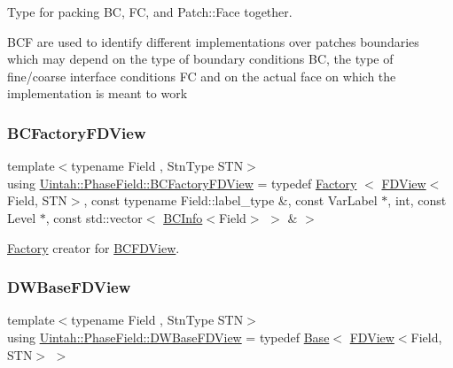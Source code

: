Type for packing BC, FC, and Patch\+::\+Face together. 

B\+CF are used to identify different implementations over patches boundaries which may depend on the type of boundary conditions BC, the type of fine/coarse interface conditions FC and on the actual face on which the implementation is meant to work \mbox{\label{namespaceUintah_1_1PhaseField_a27955353517b49f532c48918bdaa6e12}} 
\subsubsection{\texorpdfstring{B\+C\+Factory\+F\+D\+View}{BCFactoryFDView}}
{\footnotesize\ttfamily template$<$typename Field , Stn\+Type S\+TN$>$ \\
using \hyperlink{namespaceUintah_1_1PhaseField_a27955353517b49f532c48918bdaa6e12}{Uintah\+::\+Phase\+Field\+::\+B\+C\+Factory\+F\+D\+View} = typedef \hyperlink{classUintah_1_1PhaseField_1_1Factory}{Factory} $<$ \hyperlink{namespaceUintah_1_1PhaseField_a63032464b1cd54eaa53c1c29109746ac}{F\+D\+View}$<$Field, S\+TN$>$, const typename Field\+::label\+\_\+type \&, const Var\+Label $\ast$, int, const Level $\ast$, const std\+::vector$<$ \hyperlink{structUintah_1_1PhaseField_1_1BCInfo}{B\+C\+Info}$<$Field$>$ $>$ \& $>$}



\hyperlink{classUintah_1_1PhaseField_1_1Factory}{Factory} creator for \hyperlink{classUintah_1_1PhaseField_1_1BCFDView}{B\+C\+F\+D\+View}. 

\mbox{\label{namespaceUintah_1_1PhaseField_ae10b3702644c8c9c7a73a30b017a974c}} 
\subsubsection{\texorpdfstring{D\+W\+Base\+F\+D\+View}{DWBaseFDView}}
{\footnotesize\ttfamily template$<$typename Field , Stn\+Type S\+TN$>$ \\
using \hyperlink{namespaceUintah_1_1PhaseField_ae10b3702644c8c9c7a73a30b017a974c}{Uintah\+::\+Phase\+Field\+::\+D\+W\+Base\+F\+D\+View} = typedef \hyperlink{classUintah_1_1PhaseField_1_1Base}{Base}$<$ \hyperlink{namespaceUintah_1_1PhaseField_a63032464b1cd54eaa53c1c29109746ac}{F\+D\+View}$<$Field, S\+TN$>$ $>$}



